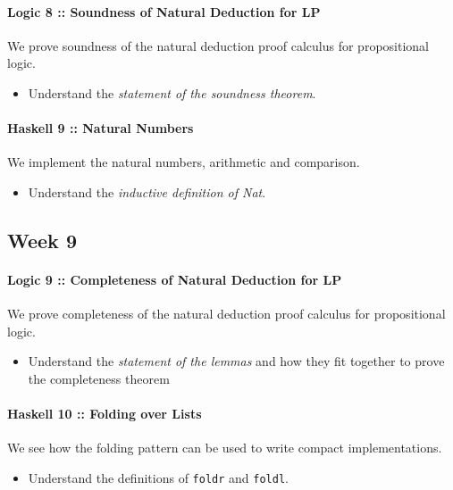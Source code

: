 \documentclass{article}[12pt]
\begin{document}
\paragraph{Logic 8 :: Soundness of Natural Deduction for LP} We prove soundness of the natural deduction proof calculus for propositional logic.
\begin{itemize}    
    \item[\twemoji{slightly smiling face}] Understand the \emph{statement of the soundness theorem}.
\end{itemize}

\paragraph{Haskell 9 :: Natural Numbers} We implement the natural numbers, arithmetic and comparison.
\begin{itemize}    
    \item[\twemoji{slightly smiling face}] Understand the \emph{inductive definition of Nat}.
\end{itemize}

\subsection*{Week 9}

\paragraph{Logic 9 :: Completeness of Natural Deduction for LP} We prove completeness of the natural deduction proof calculus for propositional logic.
\begin{itemize}    
    \item[\twemoji{slightly smiling face}] Understand the \emph{statement of the lemmas} and how they fit together to prove the completeness theorem
\end{itemize}

\paragraph{Haskell 10 :: Folding over Lists} We see how the folding pattern can be used to write compact implementations.
\begin{itemize}    
    \item[\twemoji{thinking face}] Understand the definitions of \verb|foldr| and \verb|foldl|.
\end{itemize}
\end{document}
